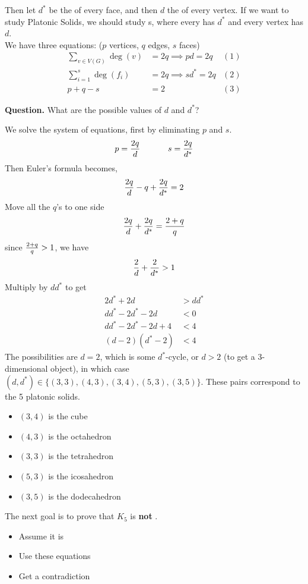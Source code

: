 \documentclass[english, 11pt]{article}
\begin{document}
Then let $d^*$ be the  of every face, and then $d$ the  of every vertex. If we want to study Platonic Solids, we should study  s, where every  has  $d^*$ and every vertex has  $d$. \\

We have three equations: ($p$ vertices, $q$ edges, $s$ faces)
\begin{align*}
  \sum_{v \in V(G)} \deg(v) & = 2q \implies pd = 2q &(1) \\
  \sum_{i = 1}^s \deg(f_i) & = 2q \implies sd^* = 2q &(2) \\
  p + q - s & = 2 &(3)
\end{align*}

\textbf{Question.} What are the possible values of $d$ and $d^*$?

We solve the system of equations, first by eliminating $p$ and $s$.
\[ p = \frac{2q}{d} \ \ \ \ \ \ \ \ \ \ s = \frac{2q}{d^*} \]
Then Euler's formula becomes,
\[ \frac{2q}{d} - q + \frac{2q}{d^*} = 2 \]
Move all the $q$'s to one side
\[ \frac{2q}{d} + \frac{2q}{d^*} = \frac{2+q}{q} \]
since $\frac{2+q}{q} > 1$, we have
\[ \frac{2}{d} + \frac{2}{d^*} > 1 \]
Multiply by $dd^*$ to get
\begin{align*}
   2d^* + 2d & > dd^* \\
   dd^* - 2d^* - 2d & < 0 \\
   dd^* -2d^* -2d + 4 & < 4 \\
   (d - 2)(d^* - 2) & < 4
 \end{align*}
 The possibilities are $d = 2$, which is some $d^*$-cycle, or $d > 2$ (to get a 3-dimensional object), in which case $(d, d^*) \in \{(3,3), (4,3), (3,4), (5,3), (3,5)\}$. These pairs correspond to the 5 platonic solids.
 \begin{itemize}
   \item $(3,4)$ is the cube
   \item $(4,3)$ is the octahedron
   \item $(3,3)$ is the tetrahedron
   \item $(5,3)$ is the icosahedron
   \item $(3,5)$ is the dodecahedron
 \end{itemize}

 The next goal is to prove that $K_5$ is \textbf{not} .
 \begin{itemize}
   \item Assume it is
   \item Use these equations
   \item Get a contradiction
 \end{itemize}
\end{document}
